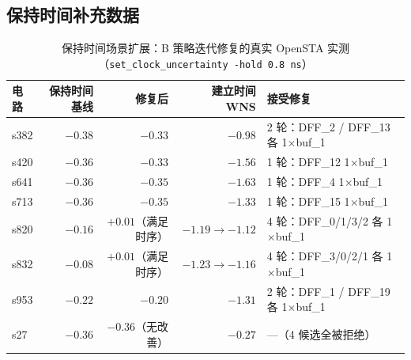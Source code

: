 \documentclass[journal]{IEEEtran}
\begin{document}
\begin{appendices}
\section{保持时间补充数据}\label{app:hold}

\begin{table}[!htbp]
\centering
\caption{保持时间场景扩展：B 策略迭代修复的真实 OpenSTA 实测（\texttt{set\_clock\_uncertainty -hold 0.8\,ns}）}
\label{tab:hold}
\scriptsize
\setlength{\tabcolsep}{2pt}
\begin{tabular}{lrrrp{2.0cm}}
\toprule
\textbf{电路} & \textbf{保持时间基线} & \textbf{修复后} & \textbf{建立时间 WNS} & \textbf{接受修复} \\
\midrule
s382 & $-0.38$ & $-0.33$ & $-0.98$ & 2 轮：DFF\_2 / DFF\_13 各 1$\times$buf\_1 \\
s420 & $-0.36$ & $-0.33$ & $-1.56$ & 1 轮：DFF\_12 1$\times$buf\_1 \\
s641 & $-0.36$ & $-0.35$ & $-1.63$ & 1 轮：DFF\_4 1$\times$buf\_1 \\
s713 & $-0.36$ & $-0.35$ & $-1.33$ & 1 轮：DFF\_15 1$\times$buf\_1 \\
s820 & $-0.16$ & $+0.01$（满足时序） & $-1.19\rightarrow -1.12$ & 4 轮：DFF\_0/1/3/2 各 1$\times$buf\_1 \\
s832 & $-0.08$ & $+0.01$（满足时序） & $-1.23\rightarrow -1.16$ & 4 轮：DFF\_3/0/2/1 各 1$\times$buf\_1 \\
s953 & $-0.22$ & $-0.20$ & $-1.31$ & 2 轮：DFF\_1 / DFF\_19 各 1$\times$buf\_1 \\
s27 & $-0.36$ & $-0.36$（无改善） & $-0.27$ & ---（4 候选全被拒绝） \\
\bottomrule
\end{tabular}
\end{table}

\end{appendices}
\end{document}
